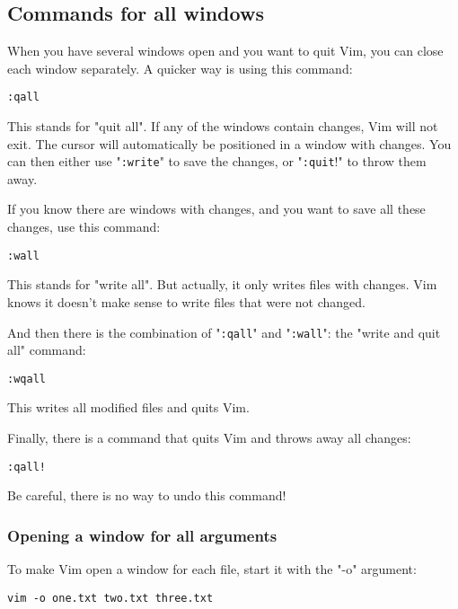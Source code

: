 \subsection{Commands for all windows}
When you have several windows open and you want to quit Vim, you can close each window separately.
A quicker way is using this command:

 \begin{Verbatim}[samepage=true]
 :qall
 \end{Verbatim}

This stands for "quit all".
If any of the windows contain changes, Vim will not exit.
The cursor will automatically be positioned in a window with changes.
You can then either use "\verb!:write!" to save the changes, or "\verb!:quit!!" to throw them away.

If you know there are windows with changes, and you want to save all these changes, use this command:

 \begin{Verbatim}[samepage=true]
 :wall
 \end{Verbatim}

This stands for "write all".
But actually, it only writes files with changes.
Vim knows it doesn't make sense to write files that were not changed.

And then there is the combination of "\verb!:qall!" and "\verb!:wall!": the "write and quit all" command:

 \begin{Verbatim}[samepage=true]
 :wqall
 \end{Verbatim}

This writes all modified files and quits Vim.

Finally, there is a command that quits Vim and throws away all changes:

 \begin{Verbatim}[samepage=true]
 :qall!
 \end{Verbatim}

Be careful, there is no way to undo this command!
\subsubsection{Opening a window for all arguments}
To make Vim open a window for each file, start it with the "-o" argument:

 \begin{Verbatim}[samepage=true]
 vim -o one.txt two.txt three.txt
 \end{Verbatim}

